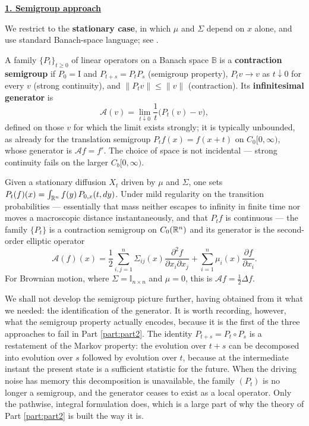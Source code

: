 \textbf{\underline{1. Semigroup approach}}
\vspace{0.2cm}

We restrict to the \textbf{stationary case}, in which $\mu$ and $\Sigma$ depend on $x$ alone, and use
standard Banach-space language; see \cite{brezis2011}.

A family $\{P_t\}_{t\geq0}$ of linear operators on a Banach space $\mathbb{B}$ is a
\textbf{contraction semigroup} if $P_0 = \mathrm{I}$ and $P_{t+s}=P_tP_s$ (semigroup property),
$P_t v \to v$ as $t \downarrow 0$ for every $v$ (strong continuity), and
$\lVert P_t v\rVert \leq \lVert v\rVert$ (contraction). Its \textbf{infinitesimal generator} is
\begin{equation}\label{pre_hilleYoshida}
\mathcal{A}(v) = \lim_{t\downarrow 0}\frac{1}{t}\bigl(P_t(v)-v\bigr),
\end{equation}
defined on those $v$ for which the limit exists strongly; it is typically unbounded, as already for
the translation semigroup $P_t f(x) = f(x+t)$ on $C_0[0,\infty)$, whose generator is $\mathcal{A}f = f'$.
The choice of space is not incidental --- strong continuity fails on the larger $C_b[0,\infty)$.

Given a stationary diffusion $X_t$ driven by $\mu$ and $\Sigma$, one sets
$P_t(f)(x) = \int_{\mathbb{R}^n} f(y)\,P_{0,x}(t,dy)$. Under mild regularity on the transition
probabilities --- essentially that mass neither escapes to infinity in finite time nor moves a
macroscopic distance instantaneously, and that $P_tf$ is continuous --- the family $\{P_t\}$ is a
contraction semigroup on $C_0(\mathbb{R}^n)$ and its
generator is the second-order elliptic operator
\begin{equation}
\mathcal{A}(f)(x) = \frac{1}{2}\sum_{i,j=1}^n \Sigma_{ij}(x)\frac{\partial^2 f}{\partial x_i\partial x_j}
+ \sum_{i=1}^n \mu_i(x)\frac{\partial f}{\partial x_i} .
\end{equation}
For Brownian motion, where $\Sigma = \mathbb{I}_{n\times n}$ and $\mu = 0$, this is
$\mathcal{A}f = \tfrac12\Delta f$.

We shall not develop the semigroup picture further, having obtained from it what we needed: the identification of the generator. It is worth recording, however, what the semigroup property actually encodes, because it is the first of the three approaches to fail in Part \ref{part:part2}. The identity $P_{t+s} = P_t \circ P_s$ is a restatement of the Markov property: the evolution over $t+s$ can be decomposed into evolution over $s$ followed by evolution over $t$, because at the intermediate instant the present state is a sufficient statistic for the future. When the driving noise has memory this decomposition is unavailable, the family $(P_t)$ is no longer a semigroup, and the generator ceases to exist as a local operator. Only the pathwise, integral formulation does, which is a large part of why the theory of Part \ref{part:part2} is built the way it is.

